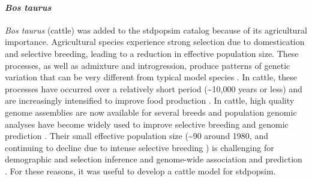 \documentclass[hidelinks]{article}
\begin{document}
\hypertarget{bos-taurus}{%
\paragraph{\texorpdfstring{\emph{Bos
taurus}}{Bos taurus}}\label{bos-taurus}}

\emph{Bos taurus} (cattle) was added to the stdpopsim catalog 
because of its agricultural importance. Agricultural species experience
strong selection due to domestication and selective breeding, leading
to a reduction in effective population size. These processes,
as well as admixture and introgression, produce patterns
of genetic variation that can be very different from typical model
species \citep{Larson2013}. In cattle, these processes have occurred over a
relatively short period (\textasciitilde 10,000 years or less) and are
increasingly intensified to improve food production \citep{Gaut2018,
MacLeod2013}. In cattle, high quality genome assemblies are now
available for several breeds \citep[e.g.,][]{Rosen2020, Heaton2021,
Talenti2022} and population genomic analyses have become widely used to
improve selective breeding and genomic prediction \citep{Meuwissen2001,
MacLeod2014, Obsteter2021}. Their small effective population size
(\textasciitilde 90 around 1980, and continuing to decline due to intense
selective breeding \citep{MacLeod2013, VanRaden2020, Makanjouloa2020}) is
challenging for demographic and selection inference \citep{MacLeod2013,
Hartfield2022} and genome-wide association and prediction
\citep{MacLeod2014}. For these reasons, it was useful to develop a
cattle model for stdpopsim.
\end{document}
